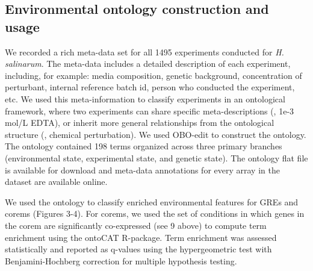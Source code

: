 \subsection{Environmental ontology construction and usage}

We recorded a rich meta-data set for all 1495 experiments conducted
for {\it H. salinarum}. The meta-data includes a detailed description of
each experiment, including, for example: media composition, genetic
background, concentration of perturbant, internal reference batch id,
person who conducted the experiment, etc. We used this
meta-information to classify experiments in an ontological framework,
where two experiments can share specific meta-descriptions (\eg, 1e-3
mol/L EDTA), or inherit more general relationships from the
ontological structure (\eg, chemical perturbation). We used OBO-edit
to construct the ontology. The ontology contained 198 terms organized
across three primary branches (environmental state, experimental
state, and genetic state). The ontology flat file is available for
download and meta-data annotations for every array in the dataset are
available online.

We used the ontology to classify enriched environmental features for
GREs and corems (Figures 3-4). For corems, we used the set of
conditions in which genes in the corem are significantly co-expressed
(see 9 above) to compute term enrichment using the ontoCAT
R-package. Term enrichment was assessed statistically and reported as
q-values using the hypergeometric test with Benjamini-Hochberg
correction for multiple hypothesis testing.
